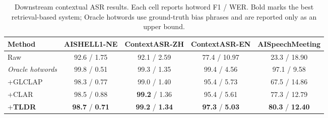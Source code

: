 \begin{table}[t]
\centering
\caption{Downstream contextual ASR results. Each cell reports hotword F1 / WER. Bold marks the best retrieval-based system; Oracle hotwords use ground-truth bias phrases and are reported only as an upper bound.}
\label{tab:decoding_main}
\small
\begin{tabular}{lcccc}
\toprule
Method & AISHELL1-NE & ContextASR-ZH & ContextASR-EN & AISpeechMeeting \\
\midrule
Raw & 92.6 / 1.75 & 92.1 / 2.59 & 77.4 / 10.97 & 23.3 / 18.90 \\
\textit{Oracle hotwords} & 99.8 / 0.51 & 99.3 / 1.35 & 99.4 / 4.56 & 97.1 / 9.58 \\
+GLCLAP & 98.3 / 0.77 & 99.0 / 1.40 & 95.4 / 5.73 & 67.5 / 14.86 \\
+CLAR & 98.5 / 0.88 & \textbf{99.2} / 1.36 & 95.4 / 5.61 & 77.3 / 12.79 \\
+\textbf{TLDR} & \textbf{98.7} / \textbf{0.71} & \textbf{99.2} / \textbf{1.34} & \textbf{97.3} / \textbf{5.03} & \textbf{80.3} / \textbf{12.40} \\
\bottomrule
\end{tabular}
\end{table}
